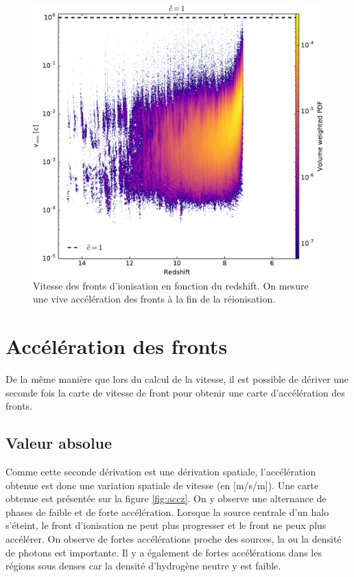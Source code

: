 \begin{figure}
        \includegraphics[width=.95\linewidth]{img/04_mapreio/speedreio_z_c1.pdf} 
        \caption[Évolution de la vitesse des fronts]{Vitesse des fronts d'ionisation en fonction du redshift.
        On mesure une vive accélération des fronts à la fin de la réionisation.
 		\label{fig:speedz}}
\end{figure}


\section{Accélération des fronts}
\label{secaccreio}

De la même manière que lors du calcul de la vitesse, il est possible de dériver une seconde fois la carte de vitesse de front pour obtenir une carte d'accélération des fronts.


\subsection{Valeur absolue}

Comme cette seconde dérivation est une dérivation spatiale, l'accélération obtenue est donc une variation spatiale de vitesse (en [m/s/m]).
Une carte obtenue est présentée sur la figure \ref{fig:accz}.
On y observe une alternance de phases de faible et de forte accélération.
Lorsque la source centrale d'un halo s’éteint, le front d'ionisation ne peut plus progresser et le front ne peux plus accélérer.
On observe de fortes accélérations proche des sources, la ou la densité de photons est importante.
Il y a également de fortes accélérations dans les régions sous denses car la densité d'hydrogène neutre y est faible.


